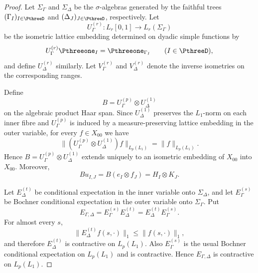 \documentclass[11pt,reqno]{amsart}
\makeatletter
\theoremstyle{plain}
\theoremstyle{definition}
\newcounter{problempaper}
\newenvironment{problempaperbody}{%
  \setcounter{subsection}{0}%
  \setcounter{subsubsection}{0}%
  \setcounter{paragraph}{0}%
  \renewcommand{\thesubsection}{\arabic{subsection}}%
  \renewcommand{\thesubsubsection}{\thesubsection.\arabic{subsubsection}}%
  \renewcommand{\theparagraph}{\thesubsubsection.\arabic{paragraph}}%
  \let\problem@outersection\section
  \let\problem@outersubsection\subsection
  \let\problem@outersubsubsection\subsubsection
  \let\problem@outerparagraph\paragraph
  \let\section\problem@papersection
  \let\subsection\problem@papersubsection
  \let\subsubsection\problem@papersubsubsection
}{%
  \let\section\problem@outersection
  \let\subsection\problem@outersubsection
  \let\subsubsection\problem@outersubsubsection
  \let\paragraph\problem@outerparagraph
}
\newcommand{\problem@target}[2]{%
  \hypertarget{problem-\theproblempaper-#1-#2}{}%
}
\newcommand{\problem@paperheading}[3]{%
  \par\bigskip
  \problem@target{#1}{#2}%
  \noindent{\large\bfseries #2.\quad #3\par}%
  \nobreak\smallskip
}
\newcommand{\problem@papersubheading}[3]{%
  \par\medskip
  \problem@target{#1}{#2}%
  \noindent{\normalsize\bfseries #2.\quad #3\par}%
  \nobreak\smallskip
}
\newcommand{\problem@papersubsubheading}[3]{%
  \par\smallskip
  \problem@target{#1}{#2}%
  \noindent{\normalsize\itshape #2.\quad #3.\ }%
}
\def\problem@papersection{%
  \@ifstar{\problem@papersectionstar}{\problem@papersectionnostar}%
}
\def\problem@papersectionstar#1{%
  \par\bigskip\noindent{\large\bfseries #1\par}\nobreak\smallskip
}
\def\problem@papersectionnostar#1{%
  \refstepcounter{subsection}%
  \setcounter{subsubsection}{0}%
  \setcounter{paragraph}{0}%
  \problem@paperheading{section}{\thesubsection}{#1}%
  \problem@writecontentsline{section}{\thesubsection}{#1}%
}
\def\problem@papersubsection{%
  \@ifstar{\problem@papersubsectionstar}{\problem@papersubsectionnostar}%
}
\def\problem@papersubsectionstar#1{%
  \par\medskip\noindent{\normalsize\bfseries #1\par}\nobreak\smallskip
}
\def\problem@papersubsectionnostar#1{%
  \refstepcounter{subsubsection}%
  \setcounter{paragraph}{0}%
  \problem@papersubheading{subsection}{\thesubsubsection}{#1}%
  \problem@writecontentsline{subsection}{\thesubsubsection}{#1}%
}
\def\problem@papersubsubsection{%
  \@ifstar{\problem@papersubsubsectionstar}{\problem@papersubsubsectionnostar}%
}
\def\problem@papersubsubsectionstar#1{%
  \par\smallskip\noindent{\normalsize\itshape #1.\ }%
}
\def\problem@papersubsubsectionnostar#1{%
  \refstepcounter{paragraph}%
  \problem@papersubsubheading{subsubsection}{\theparagraph}{#1}%
  \problem@writecontentsline{subsubsection}{\theparagraph}{#1}%
}
\newcommand{\problem@writecontentsline}[3]{%
  \begingroup
  \protected@write\@auxout{}{%
    \string\problemcontentsentry{\theproblempaper}{#1}{#2}{#3}{\thepage}%
  }%
  \endgroup
}
\newcommand{\problemcontentsentry}[5]{%
  \@ifundefined{problemcontents@#1}{%
    \expandafter\gdef\csname problemcontents@#1\endcsname{}%
  }{}%
  \expandafter\g@addto@macro\csname problemcontents@#1\endcsname{%
    \problemcontentsline{#1}{#2}{#3}{#4}{#5}%
  }%
}
\newcommand{\problemcontentslink}[4]{%
  \hyperlink{problem-#1-#2-#3}{#4}%
}
\newcommand{\problemcontentsline}[5]{%
  \ifstrequal{#2}{section}{%
    \par\noindent
    \problemcontentslink{#1}{#2}{#3}{\makebox[2.5em][l]{#3}#4}%
    \nobreak\dotfill
    \problemcontentslink{#1}{#2}{#3}{#5}\par
  }{%
    \ifstrequal{#2}{subsection}{%
      \par\noindent\hspace*{1.5em}%
      \problemcontentslink{#1}{#2}{#3}{\makebox[3.5em][l]{#3}#4}%
      \nobreak\dotfill
      \problemcontentslink{#1}{#2}{#3}{#5}\par
    }{%
      \par\noindent\hspace*{3em}%
      \problemcontentslink{#1}{#2}{#3}{\makebox[4.5em][l]{#3}#4}%
      \nobreak\dotfill
      \problemcontentslink{#1}{#2}{#3}{#5}\par
    }%
  }%
}
\makeatother
\begin{document}
\begin{problempaperbody}
\begin{proof}
Let $\Sigma_\Gamma$ and $\Sigma_\Delta$ be the $\sigma$-algebras generated by the faithful trees $(\Gamma_I)_{I\in\PthreeD}$ and $(\Delta_J)_{J\in\PthreeD}$, respectively. Let
\begin{equation*}
        U_\Gamma^{(r)}\colon L_r[0,1]\longrightarrow L_r(\Sigma_\Gamma)
\end{equation*}
be the isometric lattice embedding determined on dyadic simple functions by
\begin{equation*}
        U_\Gamma^{(r)}\Pthreeone_I=\Pthreeone_{\Gamma_I}\qquad (I\in\PthreeD),
\end{equation*}
and define $U_\Delta^{(r)}$ similarly. Let $V_\Gamma^{(r)}$ and $V_\Delta^{(r)}$ denote the inverse isometries on the corresponding ranges.

Define
\begin{equation*}
        B=U_\Gamma^{(p)}\otimes U_\Delta^{(1)}
\end{equation*}
on the algebraic product Haar span. Since $U_\Delta^{(1)}$ preserves the $L_1$-norm on each inner fibre and $U_\Gamma^{(p)}$ is induced by a measure-preserving lattice embedding in the outer variable, for every $f\in X_{00}$ we have
\begin{equation*}
     \bigl\|(U_\Gamma^{(p)}\otimes U_\Delta^{(1)})f\bigr\|_{L_p(L_1)} =\|f\|_{L_p(L_1)}.
\end{equation*}
Hence $B=U_\Gamma^{(p)}\otimes U_\Delta^{(1)}$ extends uniquely to an isometric embedding of $X_{00}$ into $X_{00}$. Moreover,
\begin{equation*}
        Bu_{I,J}=B(e_I\otimes f_J)=H_I\otimes K_J.
\end{equation*}

Let $E_{\Delta}^{(t)}$ be conditional expectation in the inner variable onto $\Sigma_\Delta$, and let $E_{\Gamma}^{(s)}$ be Bochner conditional expectation in the outer variable onto $\Sigma_\Gamma$.  Put
\begin{equation*}
        E_{\Gamma,\Delta}=E_{\Gamma}^{(s)}E_{\Delta}^{(t)}=E_{\Delta}^{(t)}E_{\Gamma}^{(s)}.
\end{equation*}
For almost every $s$,
\begin{equation*}
        \|E_{\Delta}^{(t)}f(s,\cdot)\|_1\leq\|f(s,\cdot)\|_1,
\end{equation*}
and therefore $E_{\Delta}^{(t)}$ is contractive on $L_p(L_1)$.  Also $E_{\Gamma}^{(s)}$ is the usual Bochner conditional expectation on $L_p(L_1)$ and is contractive.  Hence $E_{\Gamma,\Delta}$ is contractive on $L_p(L_1)$.


\end{proof}
\end{problempaperbody}
\end{document}
